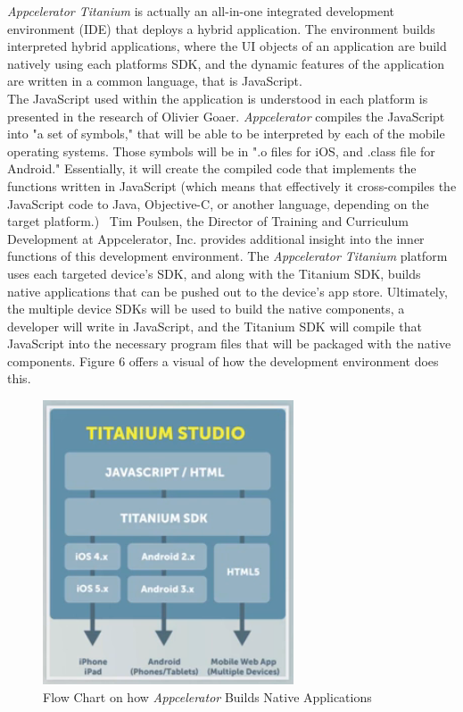 \documentclass[11pt, twocolumn]{article}
\begin{document}
{\it Appcelerator Titanium} is actually an all-in-one integrated development environment (IDE) that deploys a hybrid application.  The environment builds interpreted hybrid applications, where the UI objects of an application are build natively using each platforms SDK, and the dynamic features of the application are written in a common language, that is JavaScript. ~\cite{Xanthopoulos2013}\\

The JavaScript used within the application is understood in each platform is presented in the research of Olivier Goaer. {\it Appcelerator} compiles the JavaScript into "a set of symbols," that will be able to be interpreted by each of the mobile operating systems.  Those symbols will be in ".o files for iOS, and .class file for Android."  Essentially, it will create the compiled code that implements the functions written in JavaScript (which means that effectively it cross-compiles the JavaScript code to Java, Objective-C, or another language, depending on the target platform.)~\cite{Goaer2013}  Tim Poulsen, the Director of Training and Curriculum Development at Appcelerator, Inc. provides additional insight into the inner functions of this development environment.  The {\it Appcelerator Titanium} platform uses each targeted device's SDK, and along with the Titanium SDK, builds native applications that can be pushed out to the device's app store.  Ultimately, the multiple device SDKs will be used to build the native components, a developer will write in JavaScript, and the Titanium SDK will compile that JavaScript into the necessary program files that will be packaged with the native components.  Figure 6 offers a visual of how the development environment does this.~\cite{Poulsen2012}

\begin{figure}[h]
\includegraphics[scale=1]{appcelerator-flow-chart}
\caption{Flow Chart on how {\it Appcelerator} Builds Native Applications ~\cite{Poulsen2012}}
\end{figure}
\end{document}
